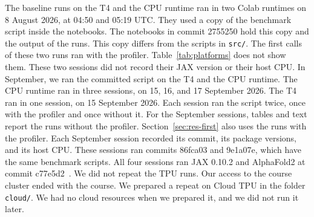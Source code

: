 The baseline runs on the T4 and the CPU runtime ran in two Colab runtimes on 8 August 2026, at 04:50 and 05:19 UTC. %
They used a copy of the benchmark script inside the notebooks.
The notebooks in commit 2755250 hold this copy and the output of the runs. This copy differs from the scripts in \texttt{src/}. %
The first calls of these two runs ran with the profiler. Table~\ref{tab:platforms} does not show them. These two sessions did not
record their JAX version or their host CPU. In September, we ran the committed script on the T4 and the CPU runtime.
The CPU runtime ran in three sessions, on 15, 16, and 17 September 2026. The T4 ran in one session, on 15 September 2026. %
Each session ran the script twice, once with the profiler and once without it. For the September sessions, tables and
text report the runs without the profiler. Section~\ref{sec:res-first} also uses the runs with the profiler. Each
September session recorded its commit, its package versions, and its host CPU.
These sessions ran commits 86fca03 and 9e1a07e, which have the same benchmark scripts. %
All four sessions ran JAX 0.10.2 and AlphaFold2 at commit c77e5d2~\cite{alphafoldrepo}. %
We did not repeat the TPU runs. Our access to the course cluster ended with the course.
We prepared a repeat on Cloud TPU in the folder \texttt{cloud/}. We had no cloud resources when we prepared it, and
we did not run it later.


